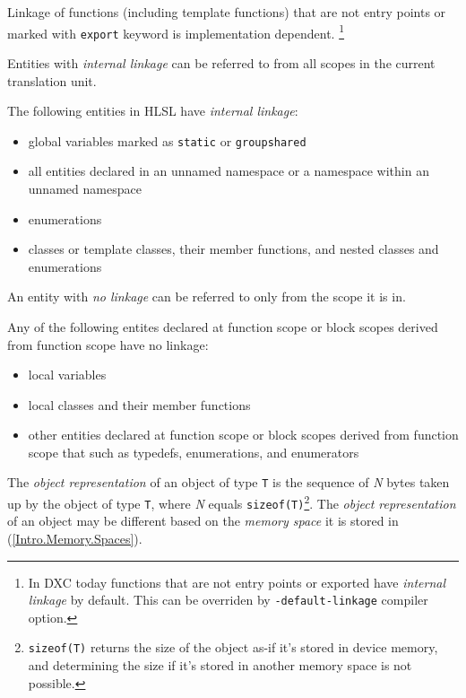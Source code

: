 \p Linkage of functions (including template functions) that are not entry points
or marked with \texttt{export} keyword is implementation dependent. \footnote{In
DXC today functions that are not entry points or exported have \textit{internal
linkage} by default. This can be overriden by \texttt{-default-linkage} compiler
option.}


\p Entities with \textit{internal linkage} can be referred to from all scopes in
the current translation unit.

\p The following entities in HLSL have \textit{internal linkage}:
\begin{itemize}
  \item global variables marked as \texttt{static} or \texttt{groupshared}
  \item all entities declared in an unnamed namespace or a namespace within an
  unnamed namespace
  \item enumerations
  \item classes or template classes, their member functions, and nested classes
  and enumerations
\end{itemize}


\p An entity with \textit{no linkage} can be referred to only from the scope it
is in.

\p Any of the following entites declared at function scope or block scopes
derived from function scope have no linkage:
\begin{itemize}
  \item local variables
  \item local classes and their member functions
  \item other entities declared at function scope or block scopes derived from
  function scope that such as typedefs, enumerations, and enumerators
\end{itemize}


\p The \textit{object representation} of an object of type \texttt{T} is the
sequence of \textit{N} bytes taken up by the object of type \texttt{T}, where
\textit{N} equals \texttt{sizeof(T)}\footnote{\texttt{sizeof(T)} returns the
size of the object as-if it's stored in device memory, and determining the size
if it's stored in another memory space is not possible.}. The \textit{object
representation} of an object may be different based on the \textit{memory space}
it is stored in (\ref{Intro.Memory.Spaces}).

